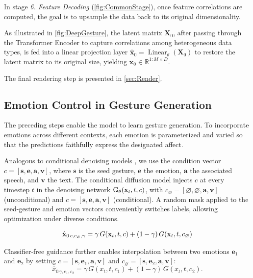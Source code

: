 In stage \textit{6. Feature Decoding} (\autoref{fig:CommonStage}), once feature correlations are computed, the goal is to upsample the data back to its original dimensionality.

As illustrated in \autoref{fig:DeepGesture}, the latent matrix $\mathbf{X}_{0}$, after passing through the Transformer Encoder to capture correlations among heterogeneous data types, is fed into a linear projection layer
$\hat{\mathbf{x}}_{0} = \operatorname{Linear}_{\theta}(\mathbf{X}_{0})$
to restore the latent matrix to its original size, yielding $\hat{\mathbf{x}}_{0} \in \mathbb{R}^{1:M \times D}$.

The final rendering step is presented in \autoref{sec:Render}.

\subsection{Emotion Control in Gesture Generation}

The preceding steps enable the model to learn gesture generation. To incorporate emotions across different contexts, each emotion is parameterized and varied so that the predictions faithfully express the designated affect.

Analogous to conditional denoising models \cite{ho2022classifier, tevet2022human}, we use the condition vector
$c = [\mathbf{s}, \mathbf{e}, \mathbf{a}, \mathbf{v}]$,  
where $\mathbf{s}$ is the seed gesture, $\mathbf{e}$ the emotion, $\mathbf{a}$ the associated speech, and $\mathbf{v}$ the text.
The conditional diffusion model injects $c$ at every timestep $t$ in the denoising network $\text{G}_\theta(\mathbf{x}_{t}, t, c)$, with
$c_{\varnothing} = [\varnothing, \varnothing, \mathbf{a}, \mathbf{v}]$ (unconditional)
and $c = [\mathbf{s}, \mathbf{e}, \mathbf{a}, \mathbf{v}]$ (conditional).
A random mask applied to the seed-gesture and emotion vectors conveniently switches labels, allowing optimization under diverse conditions.

\begin{equation} \label{eq:denoise}
	\hat{\mathbf{x}}_{0\,c,c_{\varnothing},\gamma}
	= \gamma\, G(\mathbf{x}_{t}, t, c) + (1-\gamma)\, G(\mathbf{x}_{t}, t, c_{\varnothing})
\end{equation}

Classifier-free guidance \cite{ho2022classifier} further enables interpolation between two emotions
$\mathbf{e}_1$ and $\mathbf{e}_2$ by setting
$c = [\mathbf{s}, \mathbf{e}_{1}, \mathbf{a}, \mathbf{v}]$ and
$c_{\varnothing} = [\mathbf{s}, \mathbf{e}_{2}, \mathbf{a}, \mathbf{v}]$:
\[
\hat{x}_{0\,\gamma, c_{1}, c_{2}}
= \gamma\, G(x_{t}, t, c_{1}) + (1-\gamma)\, G(x_{t}, t, c_{2}).
\]
